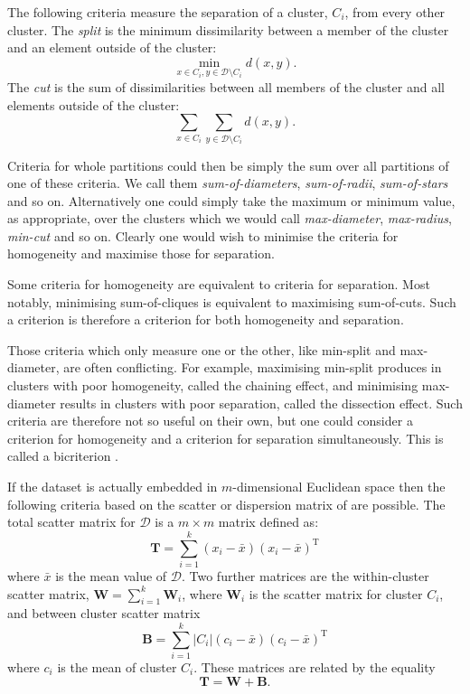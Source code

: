 \documentclass[a4paper]{report}
\newcommand{\dset}{\mathcal{D}}
\begin{document}
The following criteria measure the separation of a cluster, $C_i$, from every
other cluster.  The \textit{split} is the minimum dissimilarity between a
member of the cluster and an element outside of the cluster:
\begin{equation*}
  \min_{x \in C_i, y \in \dset \setminus C_i} d(x,y).
\end{equation*}
The \textit{cut} is the sum of dissimilarities between all members of the
cluster and all elements outside of the cluster:
\begin{equation*}
  \sum_{x \in C_i} \sum_{y \in \dset \setminus C_i} d(x,y).
\end{equation*}

Criteria for whole partitions could then be simply the sum over all partitions
of one of these criteria.  We call them \textit{sum-of-diameters},
\textit{sum-of-radii}, \textit{sum-of-stars} and so on.  Alternatively one
could simply take the maximum or minimum value, as appropriate, over the
clusters which we would call \textit{max-diameter}, \textit{max-radius},
\textit{min-cut} and so on.  Clearly one would wish to minimise the criteria
for homogeneity and maximise those for separation.

Some criteria for homogeneity are equivalent to criteria for separation.  Most
notably, minimising sum-of-cliques is equivalent to maximising sum-of-cuts.
Such a criterion is therefore a criterion for both homogeneity and separation.

Those criteria which only measure one or the other, like min-split and
max-diameter, are often conflicting.  For example, maximising min-split
produces in clusters with poor homogeneity, called the chaining effect, and
minimising max-diameter results in clusters with poor separation, called the
dissection effect.  Such criteria are therefore not so useful on their own,
but one could consider a criterion for homogeneity and a criterion for
separation simultaneously.  This is called a bicriterion
\citep{delattre1980bicriterion}.

If the dataset is actually embedded in $m$-dimensional Euclidean space then
the following criteria based on the scatter or dispersion matrix of
\citet{wilks60} are possible.  The total scatter matrix for $\dset$ is a $m
\times m$ matrix defined
as:
\begin{equation*}
  \mathbf{T} = \sum_{i=1}^{k} (x_i - \bar{x})(x_i - \bar{x})^{\mathrm{T}}
\end{equation*}
where $\bar{x}$ is the mean value of $\dset$.  Two further matrices are
the within-cluster scatter matrix, $\mathbf{W} = \sum_{i=1}^{k} \mathbf{W}_i$,
where $\mathbf{W}_i$ is the scatter matrix for cluster $C_i$, and between
cluster scatter matrix
\begin{equation*}
  \mathbf{B} =
  \sum_{i=1}^{k} |C_i| (c_i - \bar{x}) (c_i - \bar{x})^{\mathrm{T}}
\end{equation*}
where $c_i$ is the mean of cluster $C_i$.  These matrices are related by the
equality
\begin{equation*}
  \mathbf{T} = \mathbf{W} + \mathbf{B}.
\end{equation*}
\end{document}
